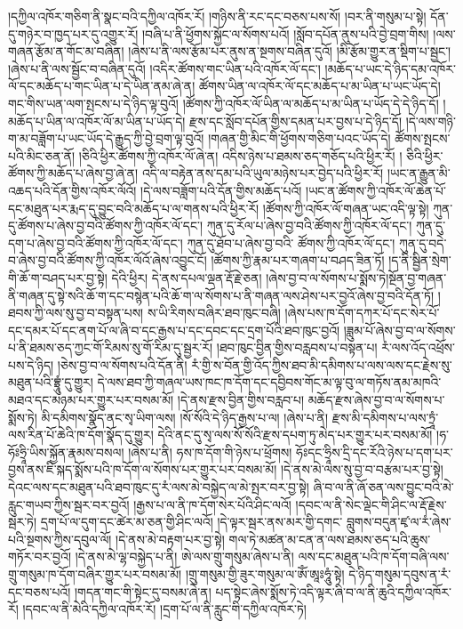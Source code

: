 །དཀྱིལ་འཁོར་གཅིག་ནི་སྣང་བའི་དཀྱིལ་འཁོར་རོ། །གཉིས་ནི་རང་དང་བཅས་པས་སོ། །བར་ནི་གསུམ་པ་སྟེ། དོན་དུ་གཉེར་བ་ཁྱད་པར་དུ་འགྱུར་རོ། །བཞི་པ་ནི་ཕྱོགས་སྐྱོང་ལ་སོགས་པའོ། །སློབ་དཔོན་ནུས་པའི་བྱེ་བྲག་གིས། །ལས་གཞན་རྩོམ་ན་གོང་མ་བཞིན། །ཞེས་པ་ནི་ལས་རྩོམ་པར་ནུས་ན་སྔགས་བཞིན་དུའོ། །མི་རྩོམ་གྱུར་ན་སྡིག་པ་སྦྱང་། །ཞེས་པ་ནི་ལས་སྦྱོང་བ་བཞིན་དུའོ། །འདིར་ཚོགས་གང་ཡིན་པའི་འཁོར་ལོ་དང་། །མཆོད་པ་ཡང་དེ་ཉིད་དམ་འཁོར་ལོ་དང་མཆོད་པ་གང་ཡིན་པ་དེ་ཡིན་ནམ་ཞེ་ན། ཚོགས་ཡིན་ལ་འཁོར་ལོ་དང་མཆོད་པ་མ་ཡིན་པ་ཡང་ཡོད་དེ། གང་གིས་ཡན་ལག་སྤངས་པ་དེ་ཉིད་ལྟ་བུའོ། །ཚོགས་ཀྱི་འཁོར་ལོ་ཡིན་ལ་མཆོད་པ་མ་ཡིན་པ་ཡོད་དེ་དེ་ཉིད་དོ། །མཆོད་པ་ཡིན་ལ་འཁོར་ལོ་མ་ཡིན་པ་ཡོད་དེ། རྫས་དང་སློབ་དཔོན་གྱིས་དམན་པར་བྱས་པ་དེ་ཉིད་དོ། །དེ་ལས་གཉི་ག་མ་བཟློག་པ་ཡང་ཡོད་དེ་རྒྱུད་ཀྱི་བྱེ་བྲག་ལྟ་བུའོ། །གཞན་གྱི་མིང་གི་ཕྱོགས་གཅིག་པའང་ཡོད་དེ། ཚོགས་སྤངས་པའི་མིང་ཅན་ནོ། །ཅིའི་ཕྱིར་ཚོགས་ཀྱི་འཁོར་ལོ་ཞེ་ན། འདིས་ཉེས་པ་ཐམས་ཅད་གཅོད་པའི་ཕྱིར་རོ། །
ཅིའི་ཕྱིར་ཚོགས་ཀྱི་མཆོད་པ་ཞེས་བྱ་ཞེ་ན། འདི་ལ་བརྟེན་ནས་དམ་པའི་ཡུལ་མཉེས་པར་བྱེད་པའི་ཕྱིར་རོ། །ཡང་ན་རྒྱུན་མི་འཆད་པའི་དོན་གྱིས་འཁོར་ལོའོ། །དེ་ལས་བཟློག་པའི་དོན་གྱིས་མཆོད་པའོ། །ཡང་ན་ཚོགས་ཀྱི་འཁོར་ལོ་ཆེན་པོ་དང་མཐུན་པར་རྨད་དུ་བྱུང་བའི་མཆོད་པ་ལ་གནས་པའི་ཕྱིར་རོ། །ཚོགས་ཀྱི་འཁོར་ལོ་གཞན་ཡང་འདི་ལྟ་སྟེ། ཀུན་དུ་ཚོགས་པ་ཞེས་བྱ་བའི་ཚོགས་ཀྱི་འཁོར་ལོ་དང་། ཀུན་དུ་རོལ་པ་ཞེས་བྱ་བའི་ཚོགས་ཀྱི་འཁོར་ལོ་དང་། ཀུན་དུ་དག་པ་ཞེས་བྱ་བའི་ཚོགས་ཀྱི་འཁོར་ལོ་དང་། ཀུན་དུ་ཐོབ་པ་ཞེས་བྱ་བའི་​ ཚོགས་ཀྱི་འཁོར་ལོ་དང་། ཀུན་དུ་བདེ་བ་ཞེས་བྱ་བའི་ཚོགས་ཀྱི་འཁོར་ལོའོ་ཞེས་འབྱུང་ངོ། །ཚོགས་ཀྱི་རྣམ་པར་གཞག་པ་བཤད་ཟིན་ཏོ། །ད་ནི་སྦྱིན་སྲེག་གི་ཆོ་ག་བཤད་པར་བྱ་སྟེ། དེའི་ཕྱིར། དེ་ནས་དཔལ་ལྡན་རྡོ་རྗེ་ཅན། །ཞེས་བྱ་བ་ལ་སོགས་པ་སྨོས་ཏེ།སྔོན་བྱ་གཞན་ནི་གཞན་དུ་སྟེ་སའི་ཆོ་ག་དང་བསྙེན་པའི་ཆོ་ག་ལ་སོགས་པ་ནི་གཞན་ལས་ཤེས་པར་བྱའོ་ཞེས་བྱ་བའི་དོན་ཏོ། །ཐབས་ཀྱི་ལས་སུ་བྱ་བ་བསྟན་པས། ས་ཡི་རིགས་བཞིར་ཐབ་ཁུང་བཞི། །ཞེས་པས་ཁ་དོག་དཀར་པོ་དང་སེར་པོ་དང་དམར་པོ་དང་ནག་པོ་ལ་ཞི་བ་དང་རྒྱས་པ་དང་དབང་དང་དྲག་པོའི་ཐབ་ཁུང་བྱའོ། །ཟླུམ་པོ་ཞེས་བྱ་བ་ལ་སོགས་པ་ནི་ཐམས་ཅད་ཀྱང་{གོ་རིམས་སུ་གོ་རིམ་དུ་}སྦྱར་རོ། །ཐབ་ཁུང་བྱིན་གྱིས་བརླབས་པ་བསྟན་པ། རཾ་ལས་འོད་འཕྲོས་པས་དེ་ཉིད། །ཅེས་བྱ་བ་ལ་སོགས་པའི་དོན་ནི། རཾ་གྱི་ས་བོན་གྱི་འོད་ཀྱིས་ཐབ་མི་དམིགས་པ་ལས་ལས་དང་རྗེས་སུ་མཐུན་པའི་བྷྲཱུཾ་དུ་གྱུར། དེ་ལས་ཐབ་ཀྱི་གཞལ་ཡས་ཁང་ཁ་དོག་དང་དབྱིབས་གོང་མ་ལྟ་བུ་ལ་གཏོས་ནམ་མཁའི་མཐའ་དང་མཉམ་པར་གྱུར་པར་བསམ་མོ། །དེ་ནས་རྫས་བྱིན་གྱིས་བརླབ་པ། མཆོད་རྫས་ཞེས་བྱ་བ་ལ་སོགས་པ་སྨོས་ཏེ། མི་དམིགས་སྣོད་ནང་སྭ་ཡིག་ལས། །སོ་སོའི་དེ་ཉིད་རྒྱས་པ་ལ། །ཞེས་པ་ནི། རྫས་མི་དམིགས་པ་ལས་ཏྲཱཾ་ལས་རིན་པོ་ཆེའི་ཁ་དོག་སྣོད་དུ་གྱུར། དེའི་ནང་དུ་སྭ་ལས་སོ་སོའི་རྫས་དཔག་ཏུ་མེད་པར་གྱུར་པར་བསམ་མོ། །ཧ་ཧོཿཧྲཱི་ཡིས་སྐྱོན་རྣམས་བསལ། །ཞེས་པ་ནི། ཧས་ཁ་དོག་གི་ཉེས་པ་ཕྲོགས། ཧོཿདང་ཧྲཱིས་དྲི་དང་རོའི་ཉེས་པ་དག་པར་བྱས་ནས་ཇི་སྐད་སྨོས་པའི་ཁ་དོག་ལ་སོགས་པར་གྱུར་པར་བསམ་མོ། །དེ་ནས་མེ་ལས་སུ་བྱ་བ་བརྩམ་པར་བྱ་སྟེ། དེའང་ལས་དང་མཐུན་པའི་ཐབ་ཁུང་དུ་རཾ་ལས་མེ་བསྐྱེད་ལ་མེ་སྤར་བར་བྱ་སྟེ། ཞི་བ་ལ་ནི་ཞོ་ཅན་ལས་བྱུང་བའི་མེ་རླུང་གཡབ་ཀྱིས་སྦར་བར་བྱའོ། །རྒྱས་པ་ལ་ནི་ཁ་དོག་སེར་པོའི་ཤིང་ལའོ། །དབང་ལ་ནི་སེང་ལྡེང་གི་ཤིང་ལ་རྡོ་རྗེས་སྦར་ཏེ། དྲག་པོ་ལ་དུག་དང་ཚེར་མ་ཅན་གྱི་ཤིང་ལའོ། །དེ་ལྟར་སྦར་ནས་མར་གྱི་དགང་​ བླུགས་བདུན་ཛྭ་ལ་རཾ་ཞེས་པའི་སྔགས་ཀྱིས་དབུལ་ལོ། །དེ་ནས་མེ་བརྟག་པར་བྱ་སྟེ། གལ་ཏེ་མཚན་མ་ངན་ན་ལས་ཐམས་ཅད་པའི་ཆུས་གཏོར་བར་བྱའོ། །དེ་ནས་མེ་ལྷ་བསྐྱེད་པ་ནི། ཨེ་ལས་གྲུ་གསུམ་ཞེས་པ་ནི། ལས་དང་མཐུན་པའི་ཁ་དོག་བཞི་ལས་གྲུ་གསུམ་ཁ་དོག་བཞིར་གྱུར་པར་བསམ་མོ། །གྲུ་གསུམ་གྱི་ཟུར་གསུམ་ལ་ཨོཾ་ཨཱཿཧཱུཾ་སྟེ། དེ་ཉིད་གསུམ་དབུས་ན་རཾ་དང་བཅས་པའོ། །གདན་གང་གི་སྟེང་དུ་བསམ་ཞེ་ན། པད་སྟེང་ཞེས་སྨོས་ཏེ་འདི་ལྟར་ཞི་བ་ལ་ནི་ཆུའི་དཀྱིལ་འཁོར་རོ། །དབང་ལ་ནི་མེའི་དཀྱིལ་འཁོར་རོ། །དྲག་པོ་ལ་ནི་རླུང་གི་དཀྱིལ་འཁོར་ཏེ། 